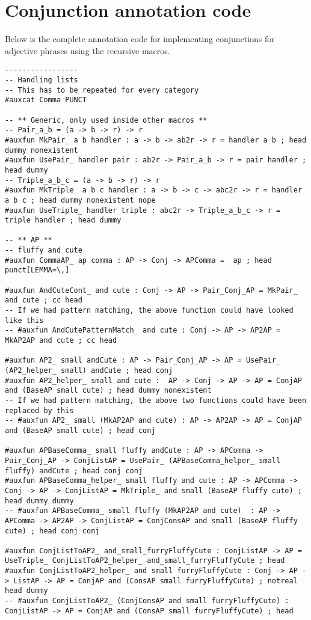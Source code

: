 \chapter{Conjunction annotation code}\label{appendix:conjunctions}

Below is the complete annotation code for implementing conjunctions for adjective phrases using the recursive macros.

\begin{lstlisting}
-----------------
-- Handling lists
-- This has to be repeated for every category
#auxcat Comma PUNCT

-- ** Generic, only used inside other macros **
-- Pair_a_b = (a -> b -> r) -> r
#auxfun MkPair_ a b handler : a -> b -> ab2r -> r = handler a b ; head dummy nonexistent
#auxfun UsePair_ handler pair : ab2r -> Pair_a_b -> r = pair handler ; head dummy
-- Triple_a_b_c = (a -> b -> r) -> r
#auxfun MkTriple_ a b c handler : a -> b -> c -> abc2r -> r = handler a b c ; head dummy nonexistent nope
#auxfun UseTriple_ handler triple : abc2r -> Triple_a_b_c -> r = triple handler ; head dummy

-- ** AP **
-- fluffy and cute
#auxfun CommaAP_ ap comma : AP -> Conj -> APComma =  ap ; head punct[LEMMA=\,]

#auxfun AndCuteCont_ and cute : Conj -> AP -> Pair_Conj_AP = MkPair_ and cute ; cc head
-- If we had pattern matching, the above function could have looked like this
-- #auxfun AndCutePatternMatch_ and cute : Conj -> AP -> AP2AP = MkAP2AP and cute ; cc head

#auxfun AP2_ small andCute : AP -> Pair_Conj_AP -> AP = UsePair_ (AP2_helper_ small) andCute ; head conj
#auxfun AP2_helper_ small and cute :  AP -> Conj -> AP -> AP = ConjAP and (BaseAP small cute) ; head dummy nonexistent
-- If we had pattern matching, the above two functions could have been replaced by this
-- #auxfun AP2_ small (MkAP2AP and cute) : AP -> AP2AP -> AP = ConjAP and (BaseAP small cute) ; head conj

#auxfun APBaseComma_ small fluffy andCute : AP -> APComma -> Pair_Conj_AP -> ConjListAP = UsePair_ (APBaseComma_helper_ small fluffy) andCute ; head conj conj
#auxfun APBaseComma_helper_ small fluffy and cute : AP -> APComma -> Conj -> AP -> ConjListAP = MkTriple_ and small (BaseAP fluffy cute) ; head dummy dummy
-- #auxfun APBaseComma_ small fluffy (MkAP2AP and cute)  : AP -> APComma -> AP2AP -> ConjListAP = ConjConsAP and small (BaseAP fluffy cute) ; head conj conj

#auxfun ConjListToAP2_ and_small_furryFluffyCute : ConjListAP -> AP = UseTriple_ ConjListToAP2_helper_ and_small_furryFluffyCute ; head
#auxfun ConjListToAP2_helper_ and small furryFluffyCute : Conj -> AP -> ListAP -> AP = ConjAP and (ConsAP small furryFluffyCute) ; notreal head dummy
-- #auxfun ConjListToAP2_ (ConjConsAP and small furryFluffyCute) : ConjListAP -> AP = ConjAP and (ConsAP small furryFluffyCute) ; head


\end{lstlisting}
